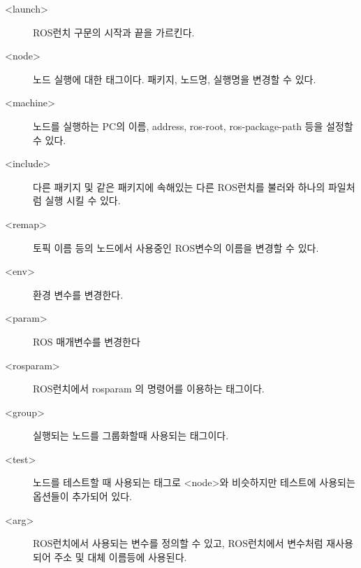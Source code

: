 \begin{description}
\item[\textless launch\textgreater] ROS런치 구문의 시작과 끝을 가르킨다.
\item[\textless node\textgreater] 노드 실행에 대한 태그이다. 패키지, 노드명, 실행명을 변경할 수 있다.
\item[\textless machine\textgreater] 노드를 실행하는 PC의 이름, address,  ros-root,  ros-package-path 등을 설정할 수 있다.
\item[\textless include\textgreater] 다른 패키지 및 같은 패키지에 속해있는 다른 ROS런치를 불러와 하나의 파일처럼 실행 시킬 수 있다.
\item[\textless remap\textgreater] 토픽 이름 등의 노드에서 사용중인 ROS변수의 이름을 변경할 수 있다. 
\item[\textless env\textgreater] 환경 변수를 변경한다.
\item[\textless param\textgreater] ROS 매개변수를 변경한다
\item[\textless rosparam\textgreater] ROS런치에서 rosparam 의 명령어를 이용하는 태그이다.
\item[\textless group\textgreater] 실행되는 노드를 그룹화할때 사용되는 태그이다.
\item[\textless test\textgreater] 노드를 테스트할 때 사용되는 태그로 \textless node\textgreater 와 비슷하지만 테스트에 사용되는 옵션들이 추가되어 있다.
\item[\textless arg\textgreater] ROS런치에서 사용되는 변수를 정의할 수 있고, ROS런치에서 변수처럼 재사용되어 주소 및 대체 이름등에 사용된다.
\end{description}

